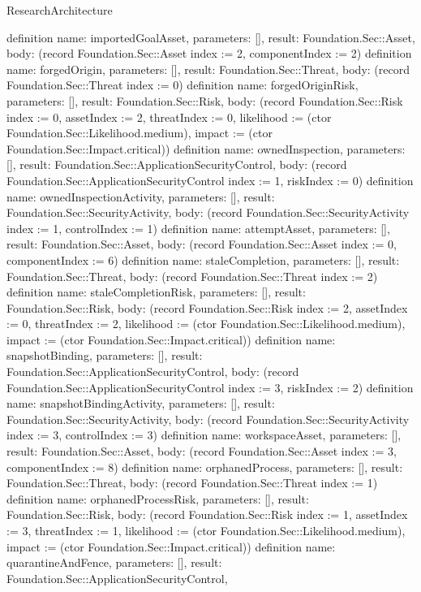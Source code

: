 \begin{lexlean}{ResearchArchitecture}
\begin{semanticmodule}
{}
definition{
 name: importedGoalAsset,
 parameters: [],
 result: Foundation.Sec::Asset,
 body: (record Foundation.Sec::Asset {index := 2, componentIndex := 2})
}
definition{
 name: forgedOrigin,
 parameters: [],
 result: Foundation.Sec::Threat,
 body: (record Foundation.Sec::Threat {index := 0})
}
definition{
 name: forgedOriginRisk,
 parameters: [],
 result: Foundation.Sec::Risk,
 body: (record Foundation.Sec::Risk {index := 0, assetIndex := 2, threatIndex := 0, likelihood := (ctor Foundation.Sec::Likelihood.medium), impact := (ctor Foundation.Sec::Impact.critical)})
}
definition{
 name: ownedInspection,
 parameters: [],
 result: Foundation.Sec::ApplicationSecurityControl,
 body: (record Foundation.Sec::ApplicationSecurityControl {index := 1, riskIndex := 0})
}
definition{
 name: ownedInspectionActivity,
 parameters: [],
 result: Foundation.Sec::SecurityActivity,
 body: (record Foundation.Sec::SecurityActivity {index := 1, controlIndex := 1})
}
definition{
 name: attemptAsset,
 parameters: [],
 result: Foundation.Sec::Asset,
 body: (record Foundation.Sec::Asset {index := 0, componentIndex := 6})
}
definition{
 name: staleCompletion,
 parameters: [],
 result: Foundation.Sec::Threat,
 body: (record Foundation.Sec::Threat {index := 2})
}
definition{
 name: staleCompletionRisk,
 parameters: [],
 result: Foundation.Sec::Risk,
 body: (record Foundation.Sec::Risk {index := 2, assetIndex := 0, threatIndex := 2, likelihood := (ctor Foundation.Sec::Likelihood.medium), impact := (ctor Foundation.Sec::Impact.critical)})
}
definition{
 name: snapshotBinding,
 parameters: [],
 result: Foundation.Sec::ApplicationSecurityControl,
 body: (record Foundation.Sec::ApplicationSecurityControl {index := 3, riskIndex := 2})
}
definition{
 name: snapshotBindingActivity,
 parameters: [],
 result: Foundation.Sec::SecurityActivity,
 body: (record Foundation.Sec::SecurityActivity {index := 3, controlIndex := 3})
}
definition{
 name: workspaceAsset,
 parameters: [],
 result: Foundation.Sec::Asset,
 body: (record Foundation.Sec::Asset {index := 3, componentIndex := 8})
}
definition{
 name: orphanedProcess,
 parameters: [],
 result: Foundation.Sec::Threat,
 body: (record Foundation.Sec::Threat {index := 1})
}
definition{
 name: orphanedProcessRisk,
 parameters: [],
 result: Foundation.Sec::Risk,
 body: (record Foundation.Sec::Risk {index := 1, assetIndex := 3, threatIndex := 1, likelihood := (ctor Foundation.Sec::Likelihood.medium), impact := (ctor Foundation.Sec::Impact.critical)})
}
definition{
 name: quarantineAndFence,
 parameters: [],
 result: Foundation.Sec::ApplicationSecurityControl,
}
\end{semanticmodule}
\end{lexlean}
